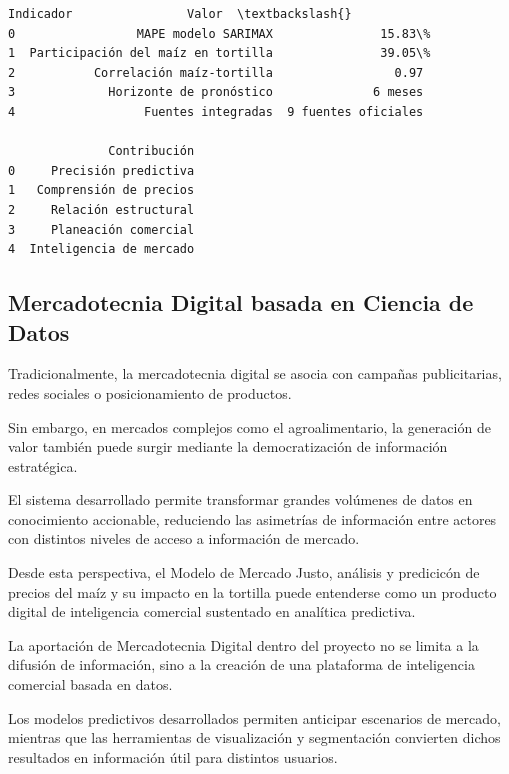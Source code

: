 \documentclass[11pt]{article}
\makeatletter
\newcommand{\boxspacing}{\kern\kvtcb@left@rule\kern\kvtcb@boxsep}
\newcommand{\prompt}[4]{
        {\ttfamily\llap{{\color{#2}[#3]:\hspace{3pt}#4}}\vspace{-\baselineskip}}
    }
\makeatother
\begin{document}
            \begin{tcolorbox}[breakable, size=fbox, boxrule=.5pt, pad at break*=1mm, opacityfill=0]
\prompt{Out}{outcolor}{322}{\boxspacing}
\begin{Verbatim}[commandchars=\\\{\}]
                            Indicador                Valor  \textbackslash{}
0                 MAPE modelo SARIMAX               15.83\%
1  Participación del maíz en tortilla               39.05\%
2           Correlación maíz-tortilla                 0.97
3             Horizonte de pronóstico              6 meses
4                  Fuentes integradas  9 fuentes oficiales

              Contribución
0     Precisión predictiva
1   Comprensión de precios
2     Relación estructural
3     Planeación comercial
4  Inteligencia de mercado
\end{Verbatim}
\end{tcolorbox}
        
    \hypertarget{mercadotecnia-digital-basada-en-ciencia-de-datos}{%
\subsection{Mercadotecnia Digital basada en Ciencia de
Datos}\label{mercadotecnia-digital-basada-en-ciencia-de-datos}}

Tradicionalmente, la mercadotecnia digital se asocia con campañas
publicitarias, redes sociales o posicionamiento de productos.

Sin embargo, en mercados complejos como el agroalimentario, la
generación de valor también puede surgir mediante la democratización de
información estratégica.

El sistema desarrollado permite transformar grandes volúmenes de datos
en conocimiento accionable, reduciendo las asimetrías de información
entre actores con distintos niveles de acceso a información de mercado.

Desde esta perspectiva, el Modelo de Mercado Justo, análisis y
predicicón de precios del maíz y su impacto en la tortilla puede
entenderse como un producto digital de inteligencia comercial sustentado
en analítica predictiva.

    La aportación de Mercadotecnia Digital dentro del proyecto no se limita
a la difusión de información, sino a la creación de una plataforma de
inteligencia comercial basada en datos.

Los modelos predictivos desarrollados permiten anticipar escenarios de
mercado, mientras que las herramientas de visualización y segmentación
convierten dichos resultados en información útil para distintos
usuarios.
\end{document}
